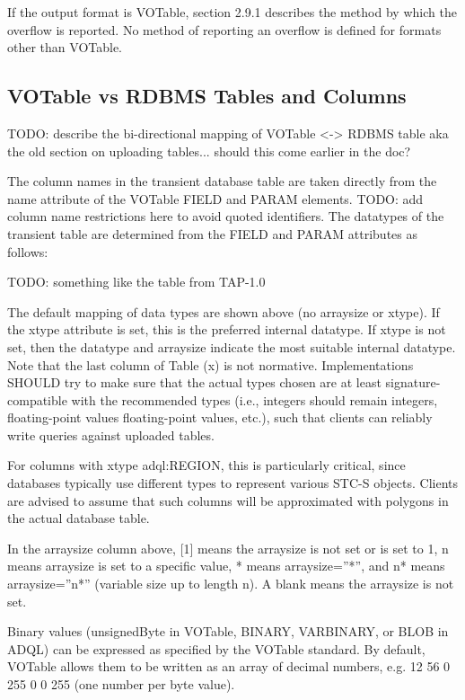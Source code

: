 \documentclass[11pt,letter]{ivoa}
\begin{document}
{If the output format is VOTable, section 2.9.1 describes the method by which 
the overflow is reported. No method of reporting an overflow is defined for 
formats other than VOTable.

\subsection{VOTable vs RDBMS Tables and Columns}
\label{sec:votable-rdbms}

TODO: describe the bi-directional mapping of VOTable <-> RDBMS table aka the 
old section on uploading tables... should this come earlier in the doc?

The column names in the transient database table are taken directly from the 
name attribute of the VOTable FIELD and PARAM elements. TODO: add column name 
restrictions here to avoid quoted identifiers. The datatypes of the 
transient table are determined from the FIELD and PARAM attributes as follows:

TODO: something like the table from TAP-1.0

The default mapping of data types are shown above (no arraysize or xtype). If 
the xtype attribute is set, this is the preferred internal datatype. If xtype is 
not set, then the datatype and arraysize indicate the most suitable internal 
datatype. Note that the last column of Table (x) is not normative. 
Implementations SHOULD try to make sure that the actual types chosen are at 
least signature-compatible with the recommended types (i.e., integers should 
remain integers, floating-point values floating-point values, etc.), such that 
clients can reliably write queries against uploaded tables.

For columns with xtype adql:REGION, this is particularly critical, since 
databases typically use different types to represent various STC-S objects. 
Clients are advised to assume that such columns will be approximated with 
polygons in the actual database table.

In the arraysize column above, [1] means the arraysize is not set or is set to 
1, n means arraysize is set to a specific value, * means arraysize=”*”, and n* 
means arraysize=”n*” (variable size up to length n). A blank means the arraysize 
is not set.

Binary values (unsignedByte in VOTable, BINARY, VARBINARY, or BLOB in ADQL) can 
be expressed as specified by the VOTable standard. By default, VOTable allows 
them to be written as an array of decimal numbers, e.g. 12 56 0 255 0 0 255 (one 
number per byte value).

}
\end{document}
